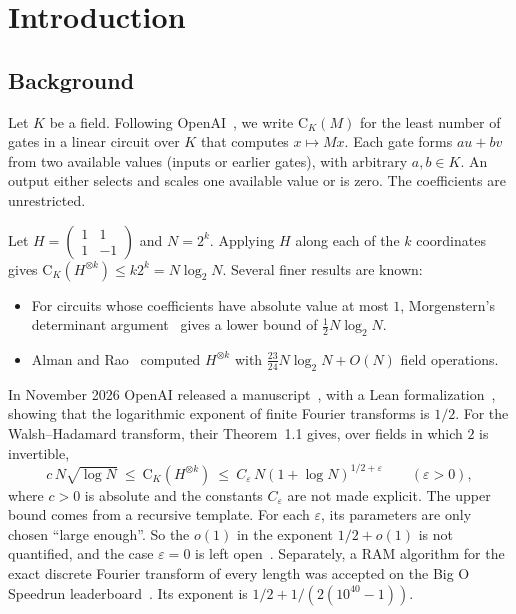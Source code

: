 \documentclass[acmsmall,nonacm,screen]{acmart}
\newcommand{\cost}{\mathrm{C}}
\begin{document}
\section{Introduction}\label{sec:intro}

\subsection{Background}

Let $K$ be a field. Following OpenAI~\cite{oai2026}, we write $\cost_K(M)$ for the least number of gates in a linear circuit over $K$ that computes $x\mapsto Mx$. Each gate forms $au+bv$ from two available values (inputs or earlier gates), with arbitrary $a,b\in K$. An output either selects and scales one available value or is zero. The coefficients are unrestricted.

Let $H=\left(\begin{smallmatrix}1&1\\1&-1\end{smallmatrix}\right)$ and $N=2^k$. Applying $H$ along each of the $k$ coordinates gives $\cost_K(H^{\otimes k})\le k2^k=N\log_2N$. Several finer results are known:
\begin{itemize}
\item For circuits whose coefficients have absolute value at most $1$, Morgenstern's determinant argument~\cite{Mor73} gives a lower bound of $\frac12N\log_2N$.
\item Alman and Rao~\cite{AR23} computed $H^{\otimes k}$ with $\frac{23}{24}N\log_2N+O(N)$ field operations.
\end{itemize}

In November 2026 OpenAI released a manuscript~\cite{oai2026}, with a Lean formalization~\cite{oaimath}, showing that the logarithmic exponent of finite Fourier transforms is $1/2$. For the Walsh--Hadamard transform, their Theorem~1.1 gives, over fields in which $2$ is invertible,
\begin{equation}\label{eq:oai}
  c\,N\sqrt{\log N}\ \le\ \cost_K(H^{\otimes k})\ \le\ C_\varepsilon\,N(1+\log N)^{1/2+\varepsilon}\qquad(\varepsilon>0),
\end{equation}
where $c>0$ is absolute and the constants $C_\varepsilon$ are not made explicit. The upper bound comes from a recursive template. For each $\varepsilon$, its parameters are only chosen ``large enough''. So the $o(1)$ in the exponent $1/2+o(1)$ is not quantified, and the case $\varepsilon=0$ is left open~\cite[p.~2]{oai2026}. Separately, a RAM algorithm for the exact discrete Fourier transform of every length was accepted on the Big O Speedrun leaderboard~\cite{bos223}. Its exponent is $1/2+1/(2(10^{40}-1))$.
\end{document}
